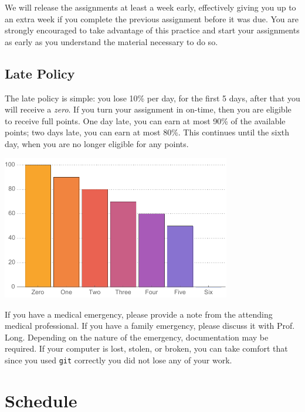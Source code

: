 \documentclass{article}
\begin{document}
We will release the assignments at least a week
early, effectively giving you up to an extra week if you complete
the previous assignment before it was due.
You are strongly encouraged to take advantage of this practice and start your
assignments as early as you understand the material necessary to do so.

\subsection{Late Policy}
The late policy is simple: you lose
10\% per day, for the first 5 days, after that you
will receive a \emph{zero}.
If you turn your assignment in on-time, then you are eligible to receive full
points. One day late, you can earn at most 90\% of the available points;
two days late, you can earn at most 80\%. This continues until the sixth day,
when you are no longer eligible for any points.


\centerline{\includegraphics[width=0.75\textwidth]{Tardiness.pdf}}

If you have a medical emergency, please provide a note from the
attending medical professional. If you have a family emergency,
please discuss it with Prof.\xspace Long. Depending on the nature
of the emergency, documentation may be required. If your computer is lost,
stolen, or broken, you can take comfort that since you used \texttt{git}
correctly you did not lose any of your work.

\section{Schedule}
\end{document}
